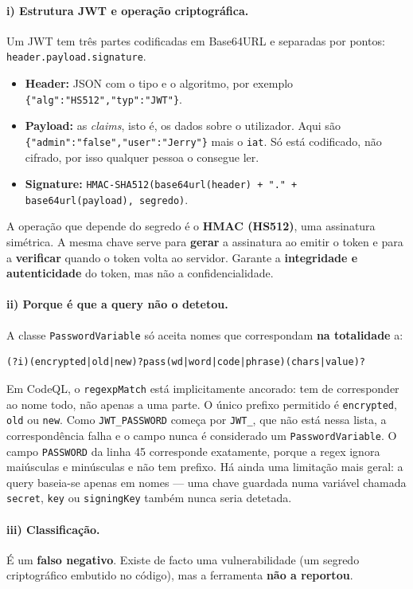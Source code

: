 \documentclass[11pt,a4paper]{article}
\begin{document}
\paragraph{i) Estrutura JWT e operação criptográfica.}
Um JWT tem três partes codificadas em Base64URL e separadas por pontos:
\texttt{header.payload.signature}.
\begin{itemize}
\item \textbf{Header:} JSON com o tipo e o algoritmo, por exemplo
\texttt{\{"alg":"HS512","typ":"JWT"\}}.
\item \textbf{Payload:} as \textit{claims}, isto é, os dados sobre o utilizador. Aqui são
\texttt{\{"admin":"false","user":"Jerry"\}} mais o \texttt{iat}. Só está codificado, não cifrado,
por isso qualquer pessoa o consegue ler.
\item \textbf{Signature:} \texttt{HMAC-SHA512(base64url(header) + "." + base64url(payload),
segredo)}.
\end{itemize}
A operação que depende do segredo é o \textbf{HMAC (HS512)}, uma assinatura simétrica. A mesma
chave serve para \textbf{gerar} a assinatura ao emitir o token e para a \textbf{verificar}
quando o token volta ao servidor. Garante a \textbf{integridade e autenticidade} do token, mas
não a confidencialidade.

\paragraph{ii) Porque é que a query não o detetou.}
A classe \texttt{PasswordVariable} só aceita nomes que correspondam \textbf{na totalidade} a:
\begin{lstlisting}
(?i)(encrypted|old|new)?pass(wd|word|code|phrase)(chars|value)?
\end{lstlisting}
Em CodeQL, o \texttt{regexpMatch} está implicitamente ancorado: tem de corresponder ao nome
todo, não apenas a uma parte. O único prefixo permitido é \texttt{encrypted}, \texttt{old} ou
\texttt{new}. Como \texttt{JWT\_PASSWORD} começa por \texttt{JWT\_}, que não está nessa lista, a
correspondência falha e o campo nunca é considerado um \texttt{PasswordVariable}. O campo
\texttt{PASSWORD} da linha 45 corresponde exatamente, porque a regex ignora maiúsculas e
minúsculas e não tem prefixo. Há ainda uma limitação mais geral: a query baseia-se apenas em
nomes --- uma chave guardada numa variável chamada \texttt{secret}, \texttt{key} ou
\texttt{signingKey} também nunca seria detetada.

\paragraph{iii) Classificação.}
É um \textbf{falso negativo}. Existe de facto uma vulnerabilidade (um segredo criptográfico
embutido no código), mas a ferramenta \textbf{não a reportou}.
\end{document}
